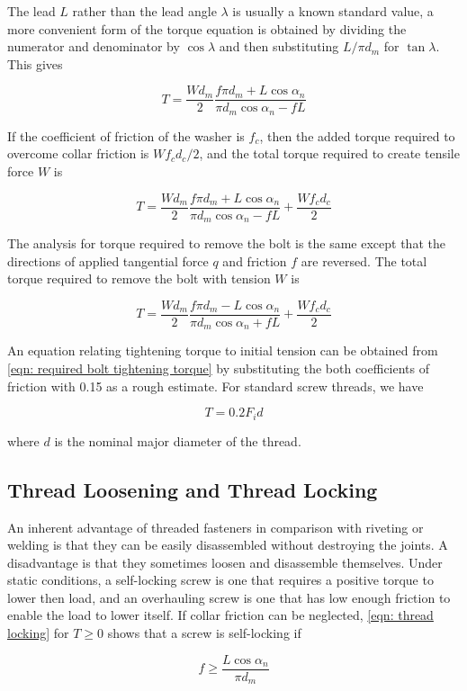 \documentclass[a4paper,openany,nobib]{tufte-book}
\begin{document}
{{The lead \(L\) rather than the lead angle \(\lambda\) is usually a known
standard value, a more convenient form of the torque equation is
obtained by dividing the numerator and denominator by \(\cos \lambda\) and
then substituting \(L/\pi d_m\) for \(\tan \lambda\). This gives

$$T = \frac{Wd_m}{2}\frac{f\pi d_m + L\cos \alpha_n}{\pi d_m\cos \alpha_n - fL}$$

If the coefficient of friction of the washer is \(f_c\), then the added
torque required to overcome collar friction is \(Wf_cd_c/2\), and the
total torque required to create tensile force \(W\) is

$$T = \frac{Wd_m}{2}\frac{f\pi d_m + L\cos \alpha_n}{\pi d_m\cos \alpha_n - fL} + \frac{Wf_cd_c}{2}$$

The analysis for torque required to remove the bolt is the same except
that the directions of applied tangential force \(q\) and friction \(f\) are
reversed. The total torque required to remove the bolt with tension \(W\)
is

$$T = \frac{Wd_m}{2}\frac{f\pi d_m - L\cos \alpha_n}{\pi d_m\cos \alpha_n + fL} + \frac{Wf_cd_c}{2}$$

An equation relating tightening torque to initial tension can be
obtained from
\ref{eqn: required bolt tightening torque}
by substituting the both coefficients of friction with 0.15 as a rough
estimate. For standard screw threads, we have

$$T = 0.2F_id$$

where \(d\) is the nominal major diameter of the thread.

\subsection{Thread Loosening and Thread Locking}
\label{thread-loosening-and-thread-locking}
An inherent advantage of threaded fasteners in comparison with riveting
or welding is that they can be easily disassembled without destroying
the joints. A disadvantage is that they sometimes loosen and disassemble
themselves. Under static conditions, a self-locking screw is one that
requires a positive torque to lower then load, and an overhauling screw
is one that has low enough friction to enable the load to lower itself.
If collar friction can be neglected,
\ref{eqn: thread locking} for \(T \geqslant 0\)
shows that a screw is self-locking if

$$f \geqslant \frac{L\cos \alpha_n}{\pi d_m}$$

}}
\end{document}
